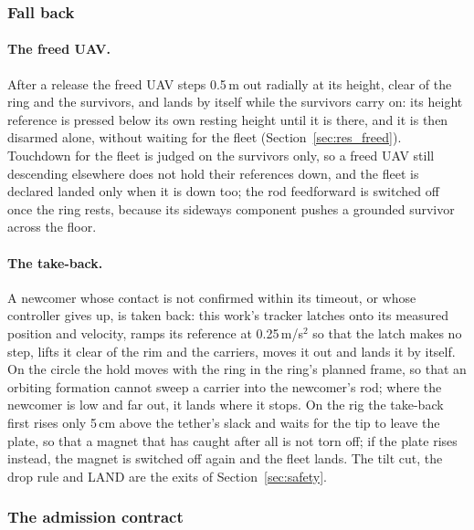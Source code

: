 \subsubsection{Fall back}

\paragraph{The freed UAV.} After a release the freed UAV steps 0.5\,m out radially at its height, clear of the ring
and the survivors, and lands by itself while the survivors carry on: its height reference is pressed below its own
resting height until it is there, and it is then disarmed alone, without waiting for the fleet
(Section~\ref{sec:res_freed}). Touchdown for the fleet is judged on the survivors only, so a freed UAV still
descending elsewhere does not hold their references down, and the fleet is declared landed only when it is down
too; the rod feedforward is switched off once the ring rests, because its sideways component pushes a grounded
survivor across the floor.

\paragraph{The take-back.} A newcomer whose contact is not confirmed within its timeout, or whose controller gives
up, is taken back: this work's tracker latches onto its measured position and velocity, ramps its reference at
0.25\,m/s$^2$ so that the latch makes no step, lifts it clear of the rim and the carriers, moves it out and lands it
by itself. On the circle the hold moves with the ring in the ring's planned frame, so that an orbiting formation
cannot sweep a carrier into the newcomer's rod; where the newcomer is low and far out, it lands where it stops. On
the rig the take-back first rises only 5\,cm above the tether's slack and waits for the tip to leave the plate, so
that a magnet that has caught after all is not torn off; if the plate rises instead, the magnet is switched off
again and the fleet lands. The tilt cut, the drop rule and LAND are the exits of Section~\ref{sec:safety}.

\subsubsection{The admission contract}
\label{sec:admission}

